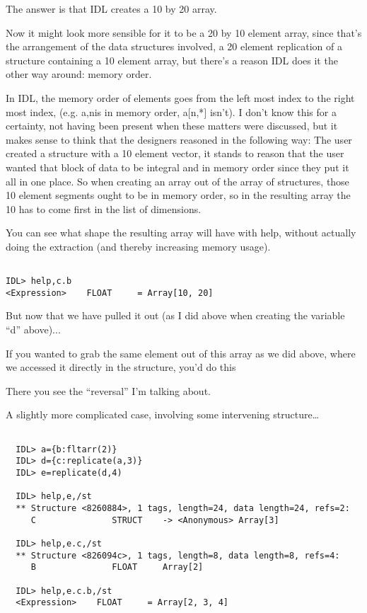 The answer is that IDL creates a 10 by 20 array.

Now it might look more sensible for it to be a 20 by 10 element array,
since that's the arrangement of the data structures involved, a 20
element replication of a structure containing a 10 element array, but
there's a reason IDL does it the other way around: memory order.

In IDL, the memory order of elements goes from the left most index to
the right most index, (e.g. a\LSB*,n\RSB is in memory order,
a$[$n,*$]$ isn't). I don't know this for a certainty, not having been
present when these matters were discussed, but it makes sense to think
that the designers reasoned in the following way: The user created a
structure with a 10 element vector, it stands to reason that the user
wanted that block of data to be integral and in memory order since
they put it all in one place. So when creating an array out of the
array of structures, those 10 element segments ought to be in memory
order, so in the resulting array the 10 has to come first in the list
of dimensions.

You can see what shape the resulting array will have with help,
without actually doing the extraction (and thereby increasing memory
usage).


\begin{IDLExample}\begin{verbatim}

IDL> help,c.b
<Expression>    FLOAT     = Array[10, 20]

\end{verbatim}
\end{IDLExample}

But now that we have pulled it out (as I did above when creating the
variable ``d'' above)...

If you wanted to grab the same element out of this array as we did
above, where we accessed it directly in the structure, you'd do this



There you see the ``reversal'' I'm talking about.

A slightly more complicated case, involving some intervening structure\ldots

\begin{IDLExample}\begin{verbatim}

  IDL> a={b:fltarr(2)}
  IDL> d={c:replicate(a,3)}
  IDL> e=replicate(d,4)

  IDL> help,e,/st
  ** Structure <8260884>, 1 tags, length=24, data length=24, refs=2:
     C               STRUCT    -> <Anonymous> Array[3]

  IDL> help,e.c,/st
  ** Structure <826094c>, 1 tags, length=8, data length=8, refs=4:
     B               FLOAT     Array[2]

  IDL> help,e.c.b,/st
  <Expression>    FLOAT     = Array[2, 3, 4]


\end{verbatim}\end{IDLExample}


